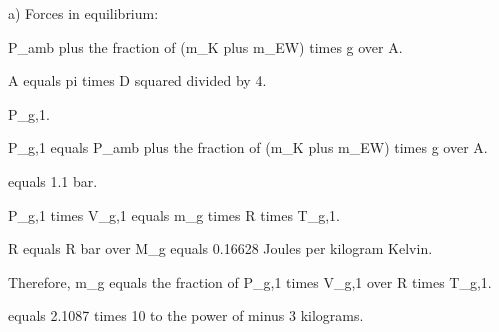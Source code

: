 a) Forces in equilibrium:

P_amb plus the fraction of (m_K plus m_EW) times g over A.

A equals pi times D squared divided by 4.

P_g,1.

P_g,1 equals P_amb plus the fraction of (m_K plus m_EW) times g over A.

equals 1.1 bar.

P_g,1 times V_g,1 equals m_g times R times T_g,1.

R equals R bar over M_g equals 0.16628 Joules per kilogram Kelvin.

Therefore, m_g equals the fraction of P_g,1 times V_g,1 over R times T_g,1.

equals 2.1087 times 10 to the power of minus 3 kilograms.